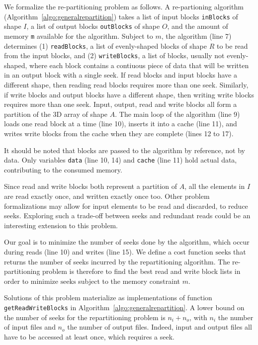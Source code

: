\documentclass[sigconf, nonacm]{acmart}
\newcommand{\tristan}[1]{\color{orange}\textbf{From Tristan:}#1\color{black}}
\begin{document}
We formalize the re-partitioning problem as follows.
A re-partioning algorithm (Algorithm~\ref{algo:generalrepartition}) takes a
list of input blocks \texttt{inBlocks} of shape $I$, a list of output
blocks \texttt{outBlocks} of shape $O$, and the amount of memory \texttt{m}
available for the algorithm. Subject to $m$, the algorithm (line 7) determines (1)
\texttt{readBlocks}, a list of evenly-shaped blocks of shape $R$ to be read from the
input blocks, and (2) \texttt{writeBlocks}, a list of blocks,
usually not evenly-shaped, where each block contains a contiuous piece of
data that will be written in an output block with a single seek.
If read blocks and input blocks have a different shape, then reading read blocks requires
more than one seek. Similarly, if write blocks and output blocks have a different shape,
then writing write blocks requires more than one seek. Input, output, read
and write blocks all form a partition of the 3D array of shape $A$. The
main loop of the algorithm (line 9) loads one read block at a time (line
10), inserts it into a cache (line 11), and writes write blocks from the
cache when they are complete (lines 12 to 17).

It should be noted that blocks are passed to the algorithm by reference,
not by data. Only variables \texttt{data} (line 10, 14) and \texttt{cache}
(line 11) hold actual data, contributing to the consumed memory. 

Since read and write blocks both represent a partition of $A$, all the
elements in $I$ are read exactly once, and written exactly once too. Other
problem formalizations may allow for input elements to be read and
discarded, to reduce seeks. Exploring such a trade-off
between seeks and redundant reads could be an interesting extension to this problem.

Our goal is to minimize the number of seeks done by the algorithm, which
occur during reads (line 10) and writes (line 15). We define a cost
function $\mathrm{seeks}$ that returns the number of seeks incurred by the
repartitioning algorithm. 
The re-partitioning problem is therefore to find
the best read and write block lists in order to minimize $\mathrm{seeks}$
subject to the memory constraint $m$. 


Solutions of this problem materialize as implementations of function
\texttt{getReadWriteBlocks} in Algorithm~\ref{algo:generalrepartition}. A
lower bound on the number of seeks for the repartitioning problem is $n_i +
n_o$, with $n_i$ the number of input files and $n_o$ the number of output
files. Indeed, input and output files all have to be accessed at least
once, which requires a seek.
\end{document}
